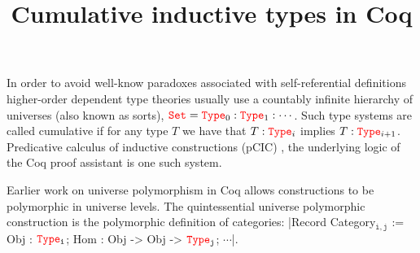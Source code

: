 \documentclass{easychair}
\title{Cumulative inductive types in Coq}
\author{
}
\institute{
 }
\newcommand{\Type}[1]{{\color{red} \mathtt{Type}}_{#1}}
\newcommand{\Set}{{\color{red} \mathtt{Set}}}
\begin{document}
\maketitle

In order to avoid well-know paradoxes associated with self-referential
definitions higher-order dependent type theories usually use a
countably infinite hierarchy of universes (also known as sorts),
$\Set = \Type{0} : \Type{1} : \cdots$. Such type systems are called
cumulative if for any type $T$ we have that $T : \Type{i}$ implies
$T : \Type{i+1}$. Predicative calculus of inductive constructions
(pCIC) \cite{coq}, the underlying logic of the Coq proof assistant is one such
system.

Earlier work \cite{DBLP:conf/itp/SozeauT14} on universe polymorphism
in Coq allows constructions to be polymorphic in universe levels.  The
quintessential universe polymorphic construction is the polymorphic definition of
categories:
\Coqe|Record Category$_{\mathtt{i, j}}$ := {Obj : $\Type{\mathtt{i}}$; Hom : Obj -> Obj -> $\Type{\mathtt{j}}$; $\cdots$}|.\footnotemark{}
\end{document}
